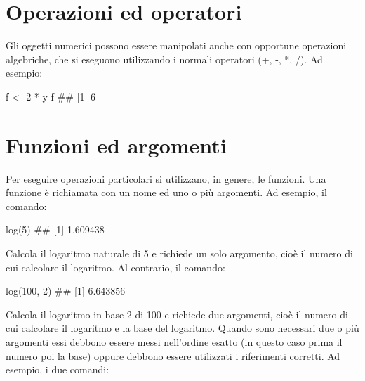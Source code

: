 \documentclass[a4paper,12pt,oneside]{book}
\newenvironment{Shaded}{\begin{snugshade}}{\end{snugshade}}
\newcommand{\DecValTok}[1]{#1}
\newcommand{\SpecialCharTok}[1]{#1}
\newcommand{\DocumentationTok}[1]{#1}
\newcommand{\OtherTok}[1]{#1}
\newcommand{\FunctionTok}[1]{#1}
\newcommand{\NormalTok}[1]{#1}
\begin{document}
\hypertarget{operazioni-ed-operatori}{%
\section*{Operazioni ed operatori}\label{operazioni-ed-operatori}}

Gli oggetti numerici possono essere manipolati anche con opportune operazioni algebriche, che si eseguono utilizzando i normali operatori (+, -, *, /). Ad esempio:

\begin{Shaded}
\begin{Highlighting}[]
\NormalTok{f  }\OtherTok{\textless{}{-}}  \DecValTok{2} \SpecialCharTok{*}\NormalTok{ y}
\NormalTok{f}
\DocumentationTok{\#\# [1] 6}
\end{Highlighting}
\end{Shaded}

\hypertarget{funzioni-ed-argomenti}{%
\section*{Funzioni ed argomenti}\label{funzioni-ed-argomenti}}

Per eseguire operazioni particolari si utilizzano, in genere, le funzioni. Una funzione è richiamata con un nome ed uno o più argomenti. Ad esempio, il comando:

\begin{Shaded}
\begin{Highlighting}[]
\FunctionTok{log}\NormalTok{(}\DecValTok{5}\NormalTok{)}
\DocumentationTok{\#\# [1] 1.609438}
\end{Highlighting}
\end{Shaded}

Calcola il logaritmo naturale di 5 e richiede un solo argomento, cioè il numero di cui calcolare il logaritmo. Al contrario, il comando:

\begin{Shaded}
\begin{Highlighting}[]
\FunctionTok{log}\NormalTok{(}\DecValTok{100}\NormalTok{, }\DecValTok{2}\NormalTok{)}
\DocumentationTok{\#\# [1] 6.643856}
\end{Highlighting}
\end{Shaded}

Calcola il logaritmo in base 2 di 100 e richiede due argomenti, cioè il numero di cui calcolare il logaritmo e la base del logaritmo. Quando sono necessari due o più argomenti essi debbono essere messi nell'ordine esatto (in questo caso prima il numero poi la base) oppure debbono essere utilizzati i riferimenti corretti. Ad esempio, i due comandi:
\end{document}
